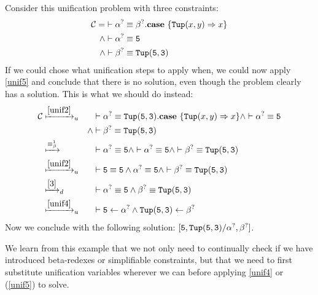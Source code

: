\documentclass[twoside,12pt,a4paper]{article}
\begin{document}
\begin{example}
    Consider this unification problem with three constraints:
    \begin{align*}
        \mathcal{C} = \;\vdash \alpha^? &\equiv \beta^?.\textbf{case}\ \{\mathtt{Tup(}x, y\mathtt{)}\Rightarrow x\}\\
        \wedge \vdash \alpha^? &\equiv \mathtt{5}\\
        \wedge \vdash \beta^? &\equiv \mathtt{Tup(5,3)}
    \end{align*}
    If we could chose what unification steps to apply when, we could now apply \cref{unif5} and conclude that there is no solution, even though the problem clearly has a solution.
    This is what we should do instead:
    \begin{align*}
        \constraints &\xmapsto{\cref{unif2}}_u& &\vdash \alphaunifvar \equiv \mathtt{Tup(5,3)}.\expatmatch{\mathttbrackets{Tup}{x, y}\Rightarrow x}\wedge \vdash \alphaunifvar \equiv \mathtt{5}\\
        &&\wedge &\vdash \betaunifvar \equiv \mathtt{Tup(5,3)}\\
        &\xmapsto{\betaconv}& &\vdash \alphaunifvar \equiv \mathtt{5}\wedge \vdash \alphaunifvar\equiv \mathtt{5}\wedge \vdash \betaunifvar \equiv \mathtt{Tup(5,3)}\\
        &\xmapsto{\cref{unif2}}_u& &\vdash \mathtt{5}\equiv \mathtt{5}\wedge \alphaunifvar\equiv\mathtt{5}\wedge \vdash \betaunifvar\equiv \mathtt{Tup(5, 3)}\\
        &\xmapsto{\cref{3}}_d& &\vdash \alphaunifvar\equiv \mathtt{5}\wedge \mathtt{\betaunifvar\equiv Tup(5, 3)}\\
        &\xmapsto{\cref{unif4}}_u& &\vdash \mathtt{5}\leftarrow\alphaunifvar\wedge \mathtt{Tup(5, 3)}\leftarrow \betaunifvar
    \end{align*}
    Now we conclude with the following solution: $[\mathtt{5, Tup(5, 3)}/\alpha^?, \beta^?]$.
\end{example}%
We learn from this example that we not only need to continually check if we have introduced beta-redexes or simplifiable constraints, 
but that we need to first substitute unification variables wherever we can before applying \cref{unif4} or (\ref{unif5}) to solve.
\end{document}
